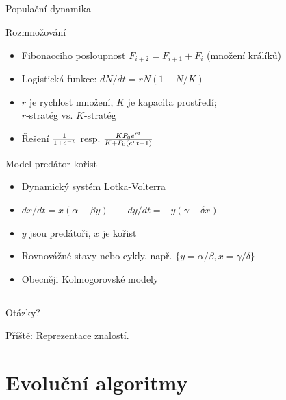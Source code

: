 \documentclass{beamer}
\begin{document}
\subsection{}
\begin{frame}{Populační dynamika}

\begin{block}{Rozmnožování}
\begin{itemize}
\item Fibonacciho posloupnost $F_{i+2} = F_{i+1} + F_i$ (množení králíků)
\item Logistická funkce: $dN/dt = rN(1-N/K)$
\item $r$ je rychlost množení, $K$ je kapacita prostředí; \\ $r$-stratég vs. $K$-stratég
\item Řešení $1 \over 1 + e^{-t}$ resp. $KP_0e^{rt} \over K+P_0(e^rt-1)$
\end{itemize}
\end{block}

\begin{block}{Model predátor-kořist}
\begin{itemize}
\item Dynamický systém Lotka-Volterra
\item $dx/dt = x(\alpha - \beta y) \qquad dy/dt = -y(\gamma - \delta x)$
\item $y$ jsou predátoři, $x$ je kořist
\item Rovnovážné stavy nebo cykly, např. $\{y=\alpha/\beta, x = \gamma/\delta\}$
\item Obecněji Kolmogorovské modely
\end{itemize}
\end{block}
\end{frame}

\subsection{}
\begin{frame}{Otázky?}
\begin{center}
Příště: Reprezentace znalostí.
\end{center}
\end{frame}

\section{Evoluční algoritmy}
\end{document}
